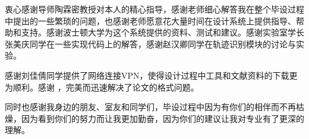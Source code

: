 
\begin{ack}
衷心感谢导师陶霖密教授对本人的精心指导，感谢老师细心解答我在整个毕设过程中提出的一些繁琐的问题，也感谢老师愿意花大量时间在设计系统上提供指导、帮助和支持。感谢波士顿大学为这个系统提供的资料、测试和建议。感谢实验室学长张美庆同学在一些实现代码上的解答，感谢赵汉卿同学在轨迹识别模块的讨论与实验。

感谢刘佳倩同学提供了网络连接VPN，使得设计过程中工具和文献资料的下载更为顺利。感谢 \thuthesis，完美而迅速解决了论文的格式问题。

同时也感谢我身边的朋友、室友和同学们，毕设过程中因为有你们的相伴而不再枯燥，因为看到你们的努力而让我更加勤奋，因为你们的建议让我对专业有了更深的理解。

\end{ack}
